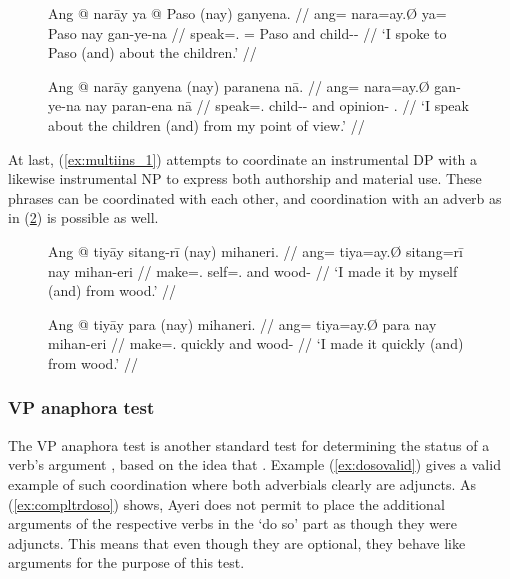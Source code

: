 \begin{figure}[h]
\pex\label{ex:multigen}
\a\label{ex:multigen_1}%
\begingl
	\gla Ang @ narāy ya @ Paso \textup{(\excl{}}nay\textup{)} ganyena. //
	\glb ang= nara=ay.Ø ya= Paso nay gan-ye-na //
	\glc \AgtT{} speak=\Fsg{}.\Top{} \Loc{}= Paso and child-\Pl{}-\Gen{} //
	\glft `I spoke to Paso (\excl{}and) about the children.' //
\endgl

\a\label{ex:multigen_2}%
\begingl
	\gla Ang @ narāy ganyena \textup{(\excl{}}nay\textup{)} paranena nā. //
	\glb ang= nara=ay.Ø gan-ye-na nay paran-ena nā //
	\glc \AgtT{} speak=\Fsg{}.\Top{} child-\Pl{}-\Gen{} and opinion-\Gen{}
		\Fsg{}.\Gen{} //
	\glft `I speak about the children (\excl{}and) from my point of view.' //
\endgl
\xe
\end{figure}

At last, (\ref{ex:multiins_1}) attempts to coordinate an instrumental DP with
a likewise instrumental NP to express both authorship and material use. These
phrases can be coordinated with each other, and coordination with an adverb as
in (\ref{ex:multiins_2}) is possible as well.

\begin{figure}
\pex\label{ex:multiins}%
\a\label{ex:multiins_1}%
\begingl
	\gla Ang @ tiyāy sitang-rī \textup{(}nay\textup{)} mihaneri. //
	\glb ang= tiya=ay.Ø sitang=rī nay mihan-eri //
	\glc \AgtT{} make=\Fsg{}.\Top{} self=\Fsg{}.\Ins{} and wood-\Ins{} //
	\glft `I made it by myself (and) from wood.' //
\endgl

\a\label{ex:multiins_2}%
\begingl
	\gla Ang @ tiyāy para \textup{(}nay\textup{)} mihaneri. //
	\glb ang= tiya=ay.Ø para nay mihan-eri //
	\glc \AgtT{} make=\Fsg{}.\Top{} quickly and wood-\Ins{} //
	\glft `I made it quickly (and) from wood.' //
\endgl
\xe
\end{figure}

\subsubsection{VP anaphora test}

The VP anaphora test is another standard test for determining the status of a
verb's argument \citep[407]{needhamtoivonen2011}, based on the idea that
. Example (\ref{ex:dosovalid}) gives a valid
example of such coordination where both adverbials clearly are adjuncts. As
(\ref{ex:compltrdoso}) shows, Ayeri does not permit to place the additional
arguments of the respective verbs in the `do so' part as though they were
adjuncts. This means that even though they are optional, they behave like
arguments for the purpose of this test.

